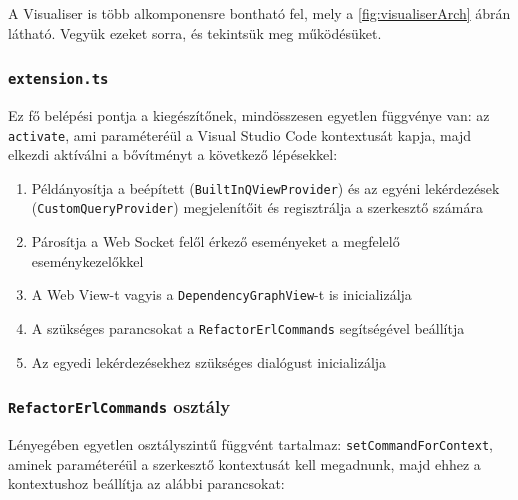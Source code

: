A Visualiser is több alkomponensre bontható fel, mely a \ref{fig:visualiserArch} ábrán látható. Vegyük ezeket sorra, és tekintsük meg működésüket.

\subsubsection{\lstinline{extension.ts}}

Ez fő belépési pontja a kiegészítőnek, mindösszesen egyetlen függvénye van: az \lstinline{activate}, ami paraméteréül a Visual Studio Code kontextusát kapja, majd elkezdi aktíválni a bővítményt a következő lépésekkel:

\begin{enumerate}
    \item Példányosítja a beépített (\lstinline{BuiltInQViewProvider}) és az egyéni lekérdezések (\lstinline{CustomQueryProvider}) megjelenítőit és regisztrálja a szerkesztő számára
    \item Párosítja a Web Socket felől érkező eseményeket a megfelelő eseménykezelőkkel
    \item A Web View-t vagyis a \lstinline{DependencyGraphView}-t is inicializálja
    \item A szükséges parancsokat a \lstinline{RefactorErlCommands} segítségével beállítja
    \item Az egyedi lekérdezésekhez szükséges dialógust inicializálja
\end{enumerate}

\subsubsection{\lstinline{RefactorErlCommands} osztály}

Lényegében egyetlen osztályszintű függvént tartalmaz: \lstinline{setCommandForContext}, aminek paraméteréül a szerkesztő kontextusát kell megadnunk, majd ehhez a kontextushoz beállítja az alábbi parancsokat:

